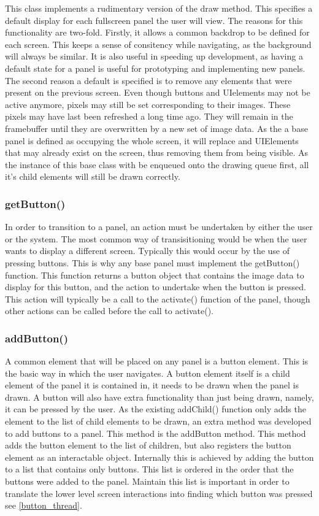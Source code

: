This class implements a rudimentary version of the draw method. This specifies a default display for each fullscreen panel the user will view. The reasons for this functionality are two-fold. Firstly, it allows a common backdrop to be defined for each screen. This keeps a sense of consitency while navigating, as the background will always be similar. It is also useful in speeding up development, as having a default state for a panel is useful for prototyping and implementing new panels. The second reason a default is specified is to remove any elements that were present on the previous screen. Even though buttons and UIelements may not be active anymore, pixels may still be set corresponding to their images. These pixels may have last been refreshed a long time ago. They will remain in the framebuffer until they are overwritten by a new set of image data. As the a base panel is defined as occupying the whole screen, it will replace and UIElements that may already exist on the screen, thus removing them from being visible. As the instance of this base class with be enqueued onto the drawing queue first, all it's child elements will still be drawn correctly.

\subsubsection{getButton()}

In order to transition to a panel, an action must be undertaken by either the user or the system. The most common way of transisitioning would be when the user wants to display a different screen. Typically this would occur by the use of pressing buttons. This is why any base panel must implement the getButton() function. This function returns a button object that contains the image data to display for this button, and the action to undertake when the button is pressed. This action will typically be a call to the activate() function of the panel, though other actions can be called before the call to activate().

\subsubsection{addButton()}

A common element that will be placed on any panel is a button element. This is the basic way in which the user navigates. A button element itself is a child element of the panel it is contained in, it needs to be drawn when the panel is drawn. A button will also have extra functionality than just being drawn, namely, it can be pressed by the user. As the existing addChild() function only adds the element to the list of child elements to be drawn, an extra method was developed to add buttons to a panel. This method is the addButton method. This method adds the button element to the list of children, but also registers the button element as an interactable object. Internally this is achieved by adding the button to a list that contains only buttons. This list is ordered in the order that the buttons were added to the panel. Maintain this list is important in order to translate the lower level screen interactions into finding which button was pressed see \ref{button_thread}.

